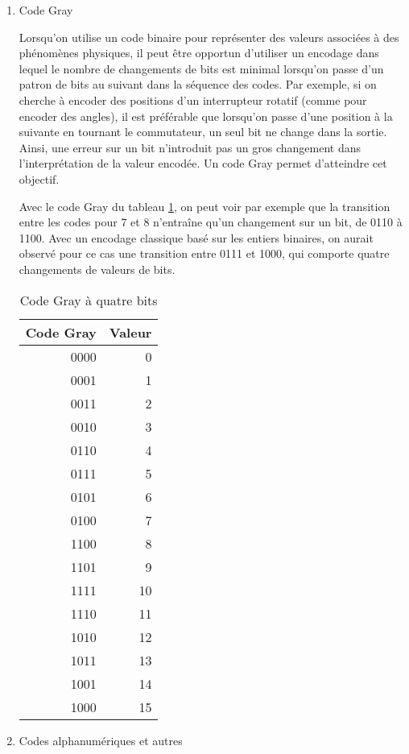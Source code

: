 \documentclass[letter, oneside]{book}
\begin{document}
\begin{enumerate}
\item Code Gray
\label{sec:org7c7c281}

Lorsqu'on utilise un code binaire pour représenter des valeurs
associées à des phénomènes physiques, il peut être opportun d'utiliser
un encodage dans lequel le nombre de changements de bits est minimal
lorsqu'on passe d'un patron de bits au suivant dans la séquence des
codes. Par exemple, si on cherche à encoder des positions d'un
interrupteur rotatif (comme pour encoder des angles), il est
préférable que lorsqu'on passe d'une position à la suivante en tournant
le commutateur, un seul bit ne change dans la sortie. Ainsi, une
erreur sur un bit n'introduit pas un gros changement dans
l'interprétation de la valeur encodée. Un code Gray permet d'atteindre
cet objectif.

Avec le code Gray du tableau \ref{tab:org6bcec9c}, on peut voir par exemple que la
transition entre les codes pour 7 et 8 n'entraîne qu'un changement sur
un bit, de 0110 à 1100. Avec un encodage classique basé sur les
entiers binaires, on aurait observé pour ce cas une transition entre
0111 et 1000, qui comporte quatre changements de valeurs de bits.

\begin{table}[htbp]
\caption{\label{tab:org6bcec9c}Code Gray à quatre bits}
\centering
\begin{tabular}{rr}
Code Gray & Valeur\\[0pt]
\hline
0000 & 0\\[0pt]
0001 & 1\\[0pt]
0011 & 2\\[0pt]
0010 & 3\\[0pt]
0110 & 4\\[0pt]
0111 & 5\\[0pt]
0101 & 6\\[0pt]
0100 & 7\\[0pt]
1100 & 8\\[0pt]
1101 & 9\\[0pt]
1111 & 10\\[0pt]
1110 & 11\\[0pt]
1010 & 12\\[0pt]
1011 & 13\\[0pt]
1001 & 14\\[0pt]
1000 & 15\\[0pt]
\end{tabular}
\end{table}


\item Codes alphanumériques et autres
\label{sec:org50f7955}


\end{enumerate}
\end{document}
